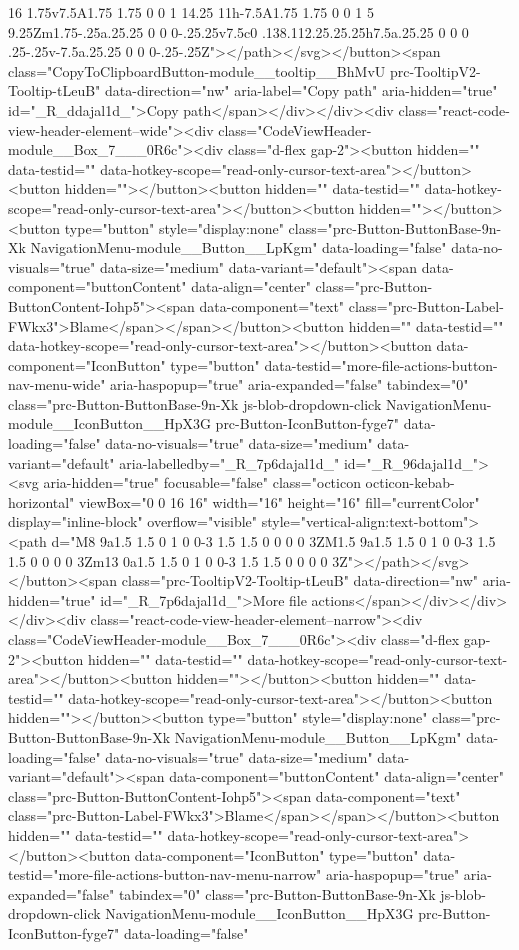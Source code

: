 {{{{{{{16 1.75v7.5A1.75 1.75 0 0 1 14.25 11h-7.5A1.75 1.75 0 0 1 5 9.25Zm1.75-.25a.25.25 0 0 0-.25.25v7.5c0 .138.112.25.25.25h7.5a.25.25 0 0 0 .25-.25v-7.5a.25.25 0 0 0-.25-.25Z"></path></svg></button><span class="CopyToClipboardButton-module__tooltip__BhMvU prc-TooltipV2-Tooltip-tLeuB" data-direction="nw" aria-label="Copy path" aria-hidden="true" id="_R_ddajal1d_">Copy path</span></div></div><div class="react-code-view-header-element--wide"><div class="CodeViewHeader-module__Box_7___0R6c"><div class="d-flex gap-2"><button hidden="" data-testid="" data-hotkey-scope="read-only-cursor-text-area"></button><button hidden=""></button><button hidden="" data-testid="" data-hotkey-scope="read-only-cursor-text-area"></button><button hidden=""></button><button type="button" style="display:none" class="prc-Button-ButtonBase-9n-Xk NavigationMenu-module__Button__LpKgm" data-loading="false" data-no-visuals="true" data-size="medium" data-variant="default"><span data-component="buttonContent" data-align="center" class="prc-Button-ButtonContent-Iohp5"><span data-component="text" class="prc-Button-Label-FWkx3">Blame</span></span></button><button hidden="" data-testid="" data-hotkey-scope="read-only-cursor-text-area"></button><button data-component="IconButton" type="button" data-testid="more-file-actions-button-nav-menu-wide" aria-haspopup="true" aria-expanded="false" tabindex="0" class="prc-Button-ButtonBase-9n-Xk js-blob-dropdown-click NavigationMenu-module__IconButton__HpX3G prc-Button-IconButton-fyge7" data-loading="false" data-no-visuals="true" data-size="medium" data-variant="default" aria-labelledby="_R_7p6dajal1d_" id="_R_96dajal1d_"><svg aria-hidden="true" focusable="false" class="octicon octicon-kebab-horizontal" viewBox="0 0 16 16" width="16" height="16" fill="currentColor" display="inline-block" overflow="visible" style="vertical-align:text-bottom"><path d="M8 9a1.5 1.5 0 1 0 0-3 1.5 1.5 0 0 0 0 3ZM1.5 9a1.5 1.5 0 1 0 0-3 1.5 1.5 0 0 0 0 3Zm13 0a1.5 1.5 0 1 0 0-3 1.5 1.5 0 0 0 0 3Z"></path></svg></button><span class="prc-TooltipV2-Tooltip-tLeuB" data-direction="nw" aria-hidden="true" id="_R_7p6dajal1d_">More file actions</span></div></div></div><div class="react-code-view-header-element--narrow"><div class="CodeViewHeader-module__Box_7___0R6c"><div class="d-flex gap-2"><button hidden="" data-testid="" data-hotkey-scope="read-only-cursor-text-area"></button><button hidden=""></button><button hidden="" data-testid="" data-hotkey-scope="read-only-cursor-text-area"></button><button hidden=""></button><button type="button" style="display:none" class="prc-Button-ButtonBase-9n-Xk NavigationMenu-module__Button__LpKgm" data-loading="false" data-no-visuals="true" data-size="medium" data-variant="default"><span data-component="buttonContent" data-align="center" class="prc-Button-ButtonContent-Iohp5"><span data-component="text" class="prc-Button-Label-FWkx3">Blame</span></span></button><button hidden="" data-testid="" data-hotkey-scope="read-only-cursor-text-area"></button><button data-component="IconButton" type="button" data-testid="more-file-actions-button-nav-menu-narrow" aria-haspopup="true" aria-expanded="false" tabindex="0" class="prc-Button-ButtonBase-9n-Xk js-blob-dropdown-click NavigationMenu-module__IconButton__HpX3G prc-Button-IconButton-fyge7" data-loading="false" }}}}}}}
